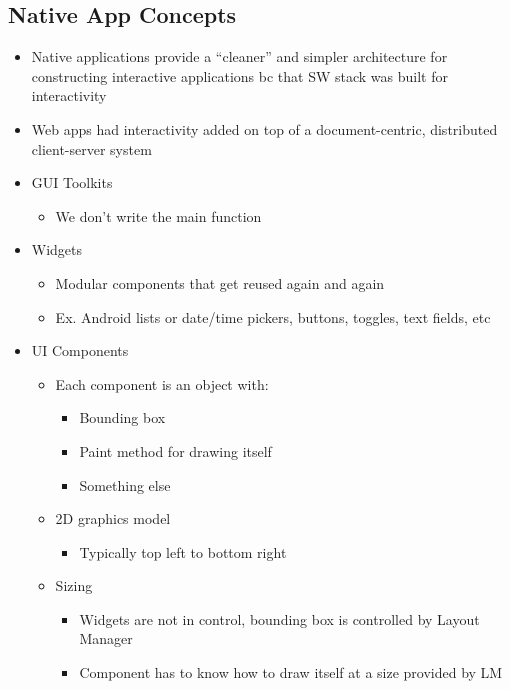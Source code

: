 \subsection{Native App Concepts}
\begin{itemize}
    \item Native applications provide a “cleaner” and simpler architecture for constructing interactive applications bc that SW stack was built for interactivity
    \item Web apps had interactivity added on top of a document-centric, distributed client-server system
    \item GUI Toolkits
    \begin{itemize}
        \item We don't write the main function
    \end{itemize}

    \item Widgets
    \begin{itemize}
        \item Modular components that get reused again and again
        \item Ex. Android lists or date/time pickers, buttons, toggles, text fields, etc
    \end{itemize}
    
    \item UI Components
    \begin{itemize}
        \item Each component is an object with:
            \begin{itemize}
                \item Bounding box
                \item Paint method for drawing itself
                \item Something else
            \end{itemize}
        \item 2D graphics model
            \begin{itemize}
                \item Typically top left to bottom right
            \end{itemize}
        \item Sizing
        \begin{itemize}
            \item Widgets are not in control, bounding box is controlled by Layout Manager
            \item Component has to know how to draw itself at a size provided by LM
        \end{itemize}
    \end{itemize}
    

\end{itemize}
